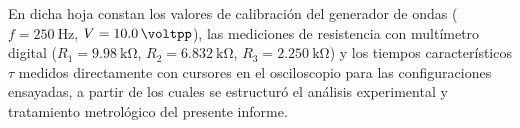 \begin{appendices}
En dicha hoja constan los valores de calibración del generador de ondas ($f = \qty{250}{\hertz}$, $V = \qty{10,0}{\voltpp}$), las mediciones de resistencia con multímetro digital ($R_1 = \qty{9,98}{\kilo\ohm}$, $R_2 = \qty{6,832}{\kilo\ohm}$, $R_3 = \qty{2,250}{\kilo\ohm}$) y los tiempos característicos $\tau$ medidos directamente con cursores en el osciloscopio para las configuraciones ensayadas, a partir de los cuales se estructuró el análisis experimental y tratamiento metrológico del presente informe.

\end{appendices}
